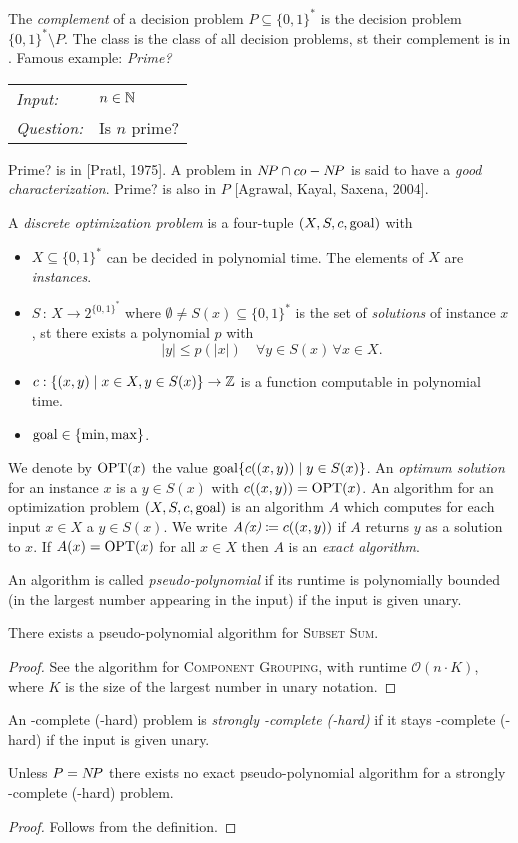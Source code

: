\documentclass[../skript.tex]{subfiles}
\begin{document}
The \emph{complement} of a decision problem $P \subseteq \{ 0, 1\}^*$ is the decision problem $\{ 0, 1\}^* \setminus P$.
The class \coNP is the class of all decision problems, \ac{st} their complement is in \NP.
Famous example: \emph{Prime?} \\
\begin{tabular}{ll}
\textit{Input:} & $n \in \mathbb{N}$ \\
\textit{Question:} & Is $n$ prime?
\end{tabular} \par
Prime? is in \NP{} [Pratl, 1975].
A problem in $N \! P \cap co-N \! P$ is said to have a \emph{good characterization}.
Prime? is also in $P$ [Agrawal, Kayal, Saxena, 2004].

A \emph{discrete optimization problem} is a four-tuple $(X, S, c, \operatorname{goal})$ with
\begin{itemize}
\item $X \subseteq \{ 0, 1\}^*$ can be decided in polynomial time. The elements of $X$ are \emph{instances}.
\item $S \, : \, X \to 2^{\{ 0, 1\}^*}$ where $\emptyset \neq S(x) \subseteq \{ 0, 1\}^*$ is the set of \emph{solutions} of instance $x$, \ac{st} there exists a polynomial $p$ with
\[
	|y| \leq p(|x|) \quad \forall y \in S(x) \, \forall x \in X.
\]
\item $c : \{ (x, y) \mid x \in X, y \in S(x)\} \to \mathbb{Z}$ is a function computable in polynomial time.
\item $\operatorname{goal} \in \{ \min, \max \}$.
\end{itemize}
We denote by \emph{$\operatorname{OPT}(x)$} the value $\operatorname{goal} \{ c((x, y)) \mid y \in S(x) \}$.
An \emph{optimum solution} for an instance $x$ is a $y \in S(x)$ with $c((x, y)) = \operatorname{OPT}(x)$. An algorithm for an optimization problem $(X, S, c, \operatorname{goal})$ is an algorithm $A$ which computes for each input $x \in X$ a $y\in S(x)$.
We write $\emph{A(x)} \coloneqq c((x, y))$ if $A$ returns $y$ as a solution to $x$.
If $A(x) = \operatorname{OPT}(x)$ for all $x \in X$ then $A$ is an \emph{exact algorithm}.

An algorithm is called \emph{pseudo-polynomial} if its runtime is polynomially bounded (in the largest number appearing in the input) if the input is given unary.
\begin{theorem} %
\label{thm:19}
There exists a pseudo-polynomial algorithm for \textsc{Subset Sum}.
\end{theorem}
\begin{proof}
See the algorithm for \textsc{Component Grouping}, with runtime $\mathcal{O}(n \cdot K)$, where $K$ is the size of the largest number in unary notation.
\end{proof}
An \NP-complete (\NP-hard) problem is \emph{strongly \NP-complete (\NP-hard)} if it stays \NP-complete (\NP-hard) if the input is given unary.
\begin{theorem} %
\label{thm:20}
Unless $P = N \! P$ there exists no exact pseudo-polynomial algorithm for a strongly \NP-complete (\NP-hard) problem.
\end{theorem}
\begin{proof}
Follows from the definition.
\end{proof}
\end{document}
